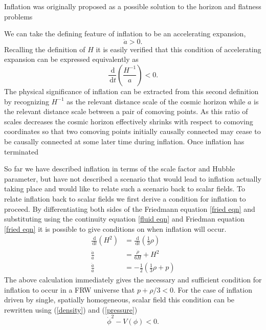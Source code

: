 \documentclass[letterpaper,11pt]{article}
\newcommand{\ud}{\,\mathrm{d}}
\begin{document}

Inflation was originally proposed as a possible solution to the horizon and flatness problems %

We can take the defining feature of inflation to be an accelerating expansion, 
\begin{equation}
\ddot{a}>0.
\end{equation}
Recalling the definition of $H$ it is easily verified that this condition of accelerating expansion can be expressed equivalently as
\begin{equation}
\frac{\ud}{\ud t}(\frac{H^{-1}}{a})<0.
\end{equation}
The physical significance of inflation can be extracted from this second definition by recognizing $H^{-1}$ as the relevant distance scale of the cosmic horizon while $a$ is the relevant distance scale between a pair of comoving points. As this ratio of scales decreases the cosmic horizon effectively shrinks with respect to comoving coordinates so that two comoving points initially causally connected may cease to be causally connected at some later time during inflation. Once inflation has terminated %


So far we have described inflation in terms of the scale factor and Hubble parameter, but have not described a scenario that would lead to inflation actually taking place and would like to relate such a scenario back to scalar fields. To relate inflation back to scalar fields we first derive a condition for inflation to proceed. By differentiating both sides of the Friedmann equation \ref{fried eqn} and substituting using the continuity equation \ref{fluid eqn} and Friedman equation \ref{fried eqn} it is possible to give conditions on when inflation will occur.%
\begin{align}
\frac{\ud}{\ud t}(H^2)&=\frac{\ud}{\ud t}(\frac{1}{3}\rho)\\
\frac{\ddot{a}}{a}&=\frac{\dot{\rho}}{6H}+H^2\\
\frac{\ddot{a}}{a}&=-\frac{1}{2}(\frac{1}{3}\rho+p)
\end{align}
The above calculation immediately gives the necessary and sufficient condition for inflation to occur in a FRW universe that $p+\rho/3<0$. For the case of inflation driven by single, spatially homogeneous, scalar field this condition can be rewritten using (\ref{density}) and (\ref{pressure})
\begin{equation}
\dot{\phi}^2-V(\phi)<0.
\end{equation}
\end{document}

